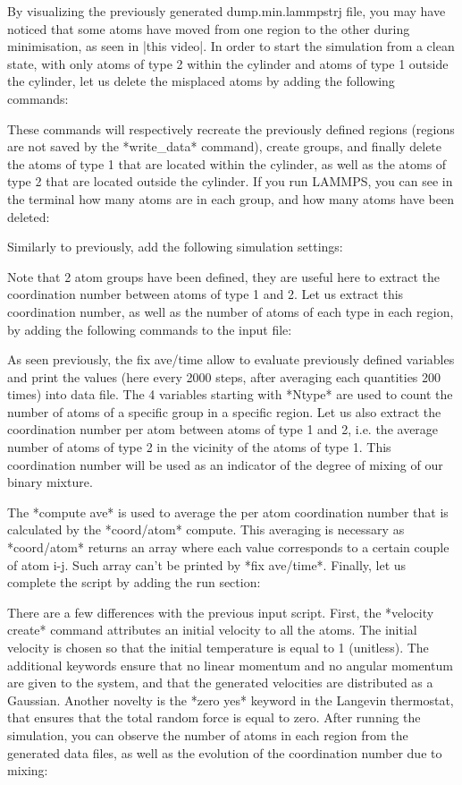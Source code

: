 By visualizing the previously generated dump.min.lammpstrj
file, you may have noticed that some atoms have moved from
one region to the other during minimisation, as seen in
|this video|.
In order to start the simulation from a clean state, with
only atoms of type 2 within the cylinder and atoms of type
1 outside the cylinder, let us delete the misplaced atoms
by adding the following commands:

These commands will respectively recreate
the previously defined regions (regions are not saved by the
*write_data* command), create groups, and finally delete the
atoms of type 1 that are located within the cylinder, as
well as the atoms of type 2 that are located outside the
cylinder. If you run LAMMPS, you can see in the terminal how
many atoms are in each group, and how many atoms have been
deleted:

Similarly to previously, add the following simulation
settings:

Note that 2 atom groups have been defined, they are useful
here to extract the coordination number between atoms of
type 1 and 2. Let us extract this coordination number, as
well as the number of atoms of each type in each region, by
adding the following commands to the input file:

As seen previously, the fix ave/time
allow to evaluate previously defined variables and print
the values (here every 2000 steps, after averaging each quantities 200 times)
into data file. The 4 variables starting with *Ntype* are used to count
the number of atoms of a specific group in a specific
region. 
Let us also extract the coordination number per atom between atoms 
of type 1 and 2, i.e. the average number of atoms of type 2 in the vicinity 
of the atoms of type 1. This coordination number will be used as an indicator of the 
degree of mixing of our binary mixture. 

The *compute ave* is used to average the per atom
coordination number that is calculated by the *coord/atom* compute.
This averaging is necessary as *coord/atom* returns an array where each value corresponds 
to a certain couple of atom i-j. Such array can't be printed by *fix ave/time*. 
Finally, let us complete the script by adding the run section:

There are a few differences with the
previous input script. First, the *velocity create*
command attributes an initial velocity to all the atoms.
The initial velocity is chosen so that the initial
temperature is equal to 1 (unitless). The additional
keywords ensure that no linear momentum and no angular
momentum are given to the system, and that the generated
velocities are distributed as a Gaussian. Another novelty
is the *zero yes* keyword in the Langevin thermostat, that
ensures that the total random force is equal to zero.
After running the simulation, you can observe the number
of atoms in each region from the generated data files, as
well as the evolution of the coordination number due to
mixing:

